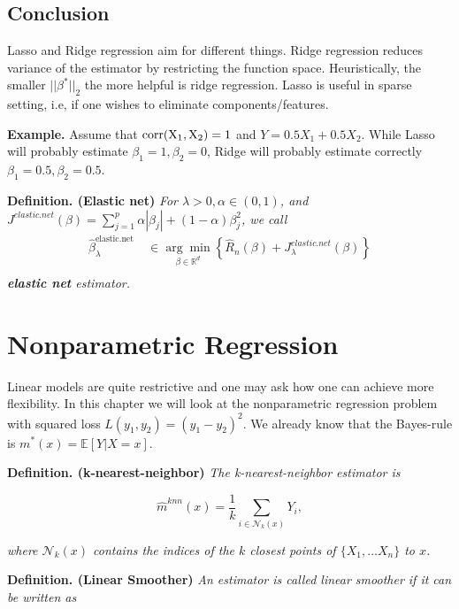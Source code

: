 \documentclass[
]{book}
\begin{document}
\hypertarget{conclusion}{%
\subsection{Conclusion}\label{conclusion}}

Lasso and Ridge regression aim for different things. Ridge regression reduces variance of the estimator by restricting the function space. Heuristically, the smaller \(||\beta^\ast||_2\) the more helpful is ridge regression. Lasso is useful in sparse setting, i.e, if one wishes to eliminate components/features.

\textbf{Example.} Assume that \(\rm{corr}(X_{1},X_2)=1\) and \(Y=0.5X_1+0.5X_2\). While Lasso will probably estimate \(\beta_1=1, \beta_2=0\), Ridge will probably estimate correctly \(\beta_1=0.5, \beta_2=0.5\).

\textbf{Definition. (Elastic net)} \emph{For \(\lambda>0, \alpha \in (0,1)\), and \(J^{elastic.net}(\beta)= \sum_{j=1}^p \alpha |\beta_j| + (1-\alpha) \beta_j^2\), we call}
\begin{align*}
\hat{\beta}_\lambda^{\text {elastic.net }} & \in \underset{\beta \in \mathbb{R}^d}{\arg \min }\left\{\hat{R}_n(\beta)+J^{elastic.net}_\lambda(\beta)\right\} \\
\end{align*}
\emph{\textbf{elastic net} estimator.}

\hypertarget{nonparametric-regression}{%
\section{Nonparametric Regression}\label{nonparametric-regression}}

Linear models are quite restrictive and one may ask how one can achieve more flexibility. In this chapter we will look at the nonparametric regression problem with squared loss \(L(y_1,y_2)=(y_1-y_2)^2\). We already know that the Bayes-rule is \(m^\ast(x)=\mathbb E[Y|X=x]\).

\textbf{Definition. (k-nearest-neighbor)} \emph{The k-nearest-neighbor estimator is }

\[
\hat m^{knn}(x)= \frac 1 k \sum_{i \in \mathcal N_k(x)}Y_i,
\]

\emph{where \(\mathcal N_k(x)\) contains the indices of the \(k\) closest points of \(\{X_1, \dots X_n\}\) to \(x\).}

\textbf{Definition. (Linear Smoother)} \emph{An estimator is called linear smoother if it can be written as }
\end{document}
